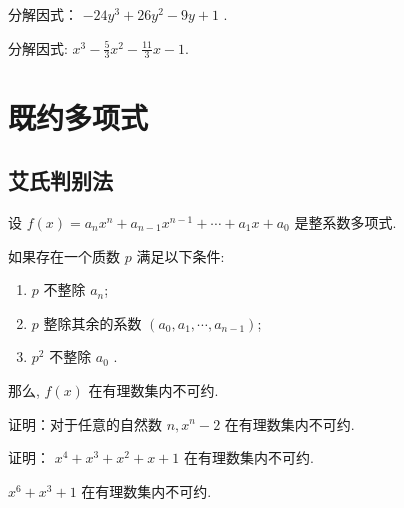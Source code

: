 \documentclass[aspectratio=169]{ctexbeamer}
\theoremstyle{definition}
\begin{document}
\begin{frame}[t]
	\begin{example}
		分解因式： $-24 y^{3}+26 y^{2}-9 y+1$ . 
	\end{example}
\end{frame}

\begin{frame}[t]
	\begin{example}
		分解因式: $x^{3}-\frac{5}{3} x^{2}-\frac{11}{3} x-1$.
	\end{example}
\end{frame}

\section{既约多项式}

\subsection{艾氏判别法}
\begin{frame}
	\begin{theorem}[艾森斯坦判别法]
		设 $f(x)=a_{n} x^{n}+a_{n-1} x^{n-1}+\cdots+a_{1} x+a_{0}$ 是整系数多项式.

		如果存在一个质数 $p$ 满足以下条件:
		\begin{enumerate}
			\item $p$ 不整除 $a_{n}$;
			\item $p$ 整除其余的系数 $\left(a_{0}, a_{1}, \cdots, a_{n-1}\right)$;
			\item $p^{2}$ 不整除 $a_{0}$ .
		\end{enumerate}
		那么, $f(x)$ 在有理数集内不可约.
	\end{theorem}
\end{frame}

\setcounter{theorem}{0}
\begin{frame}[t]
	\begin{example}
		证明：对于任意的自然数 $n, x^{n}-2$ 在有理数集内不可约.
	\end{example}
\end{frame}


\begin{frame}[t]
	\begin{example}
		证明： $x^{4}+x^{3}+x^{2}+x+1$ 在有理数集内不可约.
	\end{example}
\end{frame}


\begin{frame}[t]
	\begin{example}
		$x^{6}+x^{3}+1$ 在有理数集内不可约.
	\end{example}
\end{frame}
\end{document}
